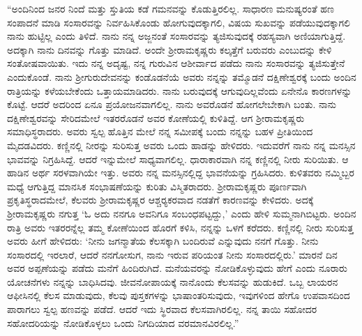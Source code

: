 “ಅಂದಿನಿಂದ ಜನರ ನಿಂದೆ ಮತ್ತು ಸ್ತುತಿಯ ಕಡೆ ಗಮನವನ್ನು ಕೊಡುತ್ತಿರಲಿಲ್ಲ. ಸಾಧಾರಣ ಮನುಷ್ಯರಂತೆ ಹಣ ಸಂಪಾದನೆ ಮಾಡಿ ಸಂಸಾರವನ್ನು ನಿರ್ವಹಿಸಿಕೊಂಡು ಹೋಗುವುದಕ್ಕಾಗಲಿ, ವಿಷಯ ಸುಖವನ್ನು ಪಡೆಯುವುದಕ್ಕಾಗಲಿ ನಾನು ಹುಟ್ಟಿಲ್ಲ ಎಂದು ತಿಳಿದೆ. ನಾನು ನನ್ನ ಅಜ್ಜನಂತೆ ಸಂಸಾರವನ್ನು ತ್ಯಜಿಸುವುದಕ್ಕೆ ರಹಸ್ಯವಾಗಿ ಅಣಿಯಾಗುತ್ತಿದ್ದೆ. ಅದಕ್ಕಾಗಿ ನಾನು ದಿನವನ್ನು ಗೊತ್ತು ಮಾಡಿದೆ. ಅಂದೇ ಶ‍್ರೀರಾಮಕೃಷ್ಣರು ಕಲ್ಕತ್ತೆಗೆ ಬರುವರು ಎಂಬುದನ್ನು ಕೇಳಿ ಸಂತೋಷವಾಯಿತು. ಇದು ನನ್ನ ಅದೃಷ್ಟ, ನನ್ನ ಗುರುವಿನ ಆಶೀರ್ವಾದ ಪಡೆದು ನಾನು ಸಂಸಾರವನ್ನು ತ್ಯಜಿಸುತ್ತೇನೆ ಎಂದುಕೊಂಡೆ. ನಾನು ಶ‍್ರೀಗುರುದೇವನನ್ನು ಕಂಡೊಡನೆಯೆ ಅವರು ನನ್ನನ್ನು ತಮ್ಮೊಡನೆ ದಕ್ಷಿಣೇಶ್ವರಕ್ಕೆ ಬಂದು ಅಂದಿನ ರಾತ್ರಿಯನ್ನು ಕಳೆಯಬೇಕೆಂದು ಒತ್ತಾಯಮಾಡಿದರು. ನಾನು ಬರುವುದಕ್ಕೆ ಆಗುವುದಿಲ್ಲವೆಂದು ಏನೇನೊ ಕಾರಣಗಳನ್ನು ಕೊಟ್ಟೆ. ಆದರೆ ಅದರಿಂದ ಏನೂ ಪ್ರಯೋಜನವಾಗಲಿಲ್ಲ. ನಾನು ಅವರೊಡನೆ ಹೋಗಲೇಬೇಕಾಗಿ ಬಂತು. ನಾನು ದಕ್ಷಿಣೇಶ್ವರವನ್ನು ಸೇರಿದಮೇಲೆ ಇತರರೊಡನೆ ಅವರ ಕೋಣೆಯಲ್ಲಿ ಕುಳಿತಿದ್ದೆ. ಆಗ ಶ‍್ರೀರಾಮಕೃಷ್ಣರು ಸಮಾಧಿಸ್ಥರಾದರು. ಅವರು ಸ್ವಲ್ಪ ಹೊತ್ತಿನ ಮೇಲೆ ನನ್ನ ಸಮೀಪಕ್ಕೆ ಬಂದು ನನ್ನನ್ನು ಬಹಳ ಪ್ರೀತಿಯಿಂದ ಮೈದಡವಿದರು. ಕಣ್ಣಿನಲ್ಲಿ ನೀರನ್ನು ಸುರಿಸುತ್ತ ಅವರು ಒಂದು ಹಾಡನ್ನು ಹೇಳಿದರು. ಇದುವರೆಗೆ ನಾನು ನನ್ನ ಮನಸ್ಸಿನ ಭಾವವನ್ನು ನಿಗ್ರಹಿಸಿದ್ದೆ. ಆದರೆ ಇನ್ನುಮೇಲೆ ಸಾಧ್ಯವಾಗಲಿಲ್ಲ. ಧಾರಾಕಾರವಾಗಿ ನನ್ನ ಕಣ್ಣಿನಲ್ಲಿ ನೀರು ಸುರಿಯಿತು. ಆ ಹಾಡಿನ ಅರ್ಥ ಸರಳವಾಗಿಯೇ ಇತ್ತು. ಅವರು ನನ್ನ ಮನಸ್ಸಿನಲ್ಲಿದ್ದ ಭಾವನೆಯನ್ನು ಗ್ರಹಿಸಿದರು. ಕುಳಿತವರು ನಮ್ಮಿಬ್ಬರ ಮಧ್ಯೆ ಆಗುತ್ತಿದ್ದ ಮಾನಸಿಕ ಸಂಭಾಷಣೆಯನ್ನು ಕುರಿತು ವಿಸ್ಮಿತರಾದರು. ಶ‍್ರೀರಾಮಕೃಷ್ಣರು ಪೂರ್ಣವಾಗಿ ಪ್ರಕೃತಿಸ್ಥರಾದಮೇಲೆ, ಕೆಲವರು ಶ‍್ರೀರಾಮಕೃಷ್ಣರ ಆಶ್ಚರ‍್ಯಕರವಾದ ನಡತೆಗೆ ಕಾರಣವನ್ನು ಕೇಳಿದರು. ಅದಕ್ಕೆ ಶ‍್ರೀರಾಮಕೃಷ್ಣರು ನಗುತ್ತ ‘ಓ ಅದು ನನಗೂ ಅವನಿಗೂ ಸಂಬಂಧಪಟ್ಟದ್ದು,’ ಎಂದು ಹೇಳಿ ಸುಮ್ಮನಾಗಿಬಿಟ್ಟರು. ಅಂದಿನ ರಾತ್ರಿ ಅವರು ಇತರರನ್ನೆಲ್ಲ ತಮ್ಮ ಕೋಣೆಯಿಂದ ಹೊರಗೆ ಕಳಿಸಿ, ನನ್ನನ್ನು ಒಳಗೆ ಕರೆದರು. ಕಣ್ಣಿನಲ್ಲಿ ನೀರು ಸುರಿಸುತ್ತ ಅವರು ಹೀಗೆ ಹೇಳಿದರು: ‘ನೀನು ಜಗನ್ಮಾತೆಯ ಕೆಲಸಕ್ಕಾಗಿ ಬಂದಿರುವೆ ಎನ್ನುವುದು ನನಗೆ ಗೊತ್ತು. ನೀನು ಸಂಸಾರದಲ್ಲಿ ಇರಲಾರೆ, ಆದರೆ ನನಗೋಸುಗ, ನಾನು ಇರುವ ಪರಿಯಂತ ನೀನು ಸಂಸಾರದಲ್ಲಿರು.’ ಮಾರನೆ ದಿನ ಅವರ ಅಪ್ಪಣೆಯನ್ನು ಪಡೆದು ಮನೆಗೆ ಹಿಂದಿರುಗಿದೆ. ಮನೆಯವರನ್ನು ನೋಡಿಕೊಳ್ಳುವುದು ಹೇಗೆ ಎಂದು ನೂರಾರು ಯೋಚನೆಗಳು ನನ್ನನ್ನು ಬಾಧಿಸಿದವು. ಜೀವನೋಪಾಯಕ್ಕೆ ನಾನೊಂದು ಕೆಲಸವನ್ನು ಹುಡುಕಿದೆ. ಒಬ್ಬ ಲಾಯರನ ಆಫೀಸಿನಲ್ಲಿ ಕೆಲಸ ಮಾಡುವುದು, ಕೆಲವು ಪುಸ್ತಕಗಳನ್ನು ಭಾಷಾಂತರಿಸುವುದು, ಇವುಗಳಿಂದ ಹೇಗೊ ಉಪವಾಸದಿಂದ ಪಾರಾಗಲು ಸ್ವಲ್ಪ ಹಣವನ್ನು ಪಡೆದೆ. ಆದರೆ ಇದು ಸ್ಥಿರವಾದ ಕೆಲಸವಾಗಿರಲಿಲ್ಲ. ನನ್ನ ತಾಯಿ ಸಹೋದರ ಸಹೋದರಿಯನ್ನು ನೋಡಿಕೊಳ್ಳಲು ಒಂದು ನಿಗದಿಯಾದ ವರಮಾನವಿರಲಿಲ್ಲ.”

